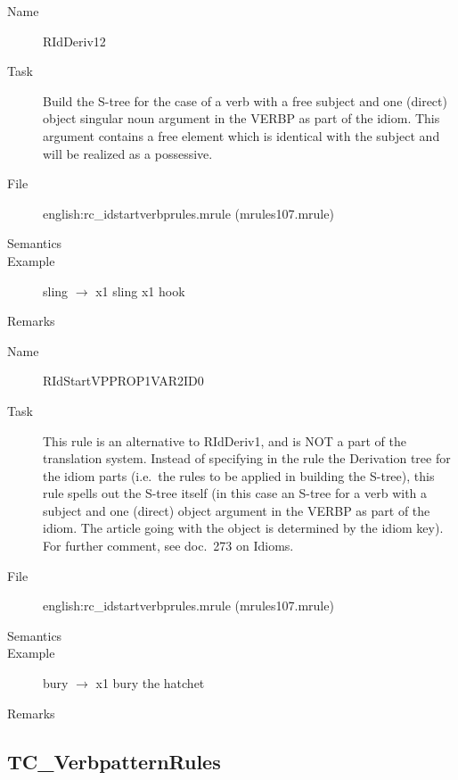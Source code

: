 \begin{description}
\vspace{1 cm}
\begin{description}
\item[Name] RIdDeriv12
\item[Task] Build the S-tree for the case of a verb with a free subject and 
one (direct) object 
singular noun argument in the VERBP as part of the idiom. This argument contains
a free element which is identical with the subject and will be realized as a 
possessive.
\item[File] english:rc\_idstartverbprules.mrule (mrules107.mrule)
\item[Semantics]
\item[Example] sling $\rightarrow$ x1 sling x1 hook
\item[Remarks]
\end{description}

\vspace{1 cm}
\begin{description}
\item[Name] RIdStartVPPROP1VAR2ID0
\item[Task] This rule is an alternative to RIdDeriv1, and is NOT a part of the 
translation system. Instead of specifying in the rule the Derivation tree 
for the idiom parts (i.e.\ the rules 
to be applied in building the S-tree), this rule spells out the S-tree itself
(in this case an S-tree for a verb with a subject and 
one (direct) object argument in the VERBP as part of the idiom. The article 
going with the object is determined by the idiom key). For further comment, 
see doc.\ 273 on Idioms.
\item[File] english:rc\_idstartverbprules.mrule (mrules107.mrule)
\item[Semantics]
\item[Example] bury $\rightarrow$ x1 bury the hatchet
\item[Remarks]
\end{description}

\end{description}

\newpage
\subsection{TC\_VerbpatternRules}

